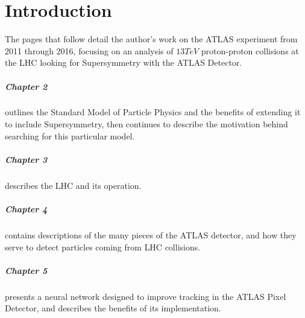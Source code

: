 
\chapter{Introduction} %

\label{ch:introduction} %

The pages that follow detail the author's work on the ATLAS experiment from 2011 through 2016, focusing on an analysis of $13 TeV$ proton-proton collisions at the \ac{LHC} looking for Supersymmetry with the ATLAS Detector. 

\paragraph{Chapter 2} outlines the Standard Model of Particle Physics and the benefits of extending it to include Supersymmetry, then continues to describe the motivation behind searching for this particular model. 

\paragraph{Chapter 3} describes the \ac{LHC} and its operation.

\paragraph{Chapter 4} contains descriptions of the many pieces of the ATLAS detector, and how they serve to detect particles coming from \ac{LHC} collisions.

\paragraph{Chapter 5} presents a neural network designed to improve tracking in the ATLAS Pixel Detector, and describes the benefits of its implementation. 

